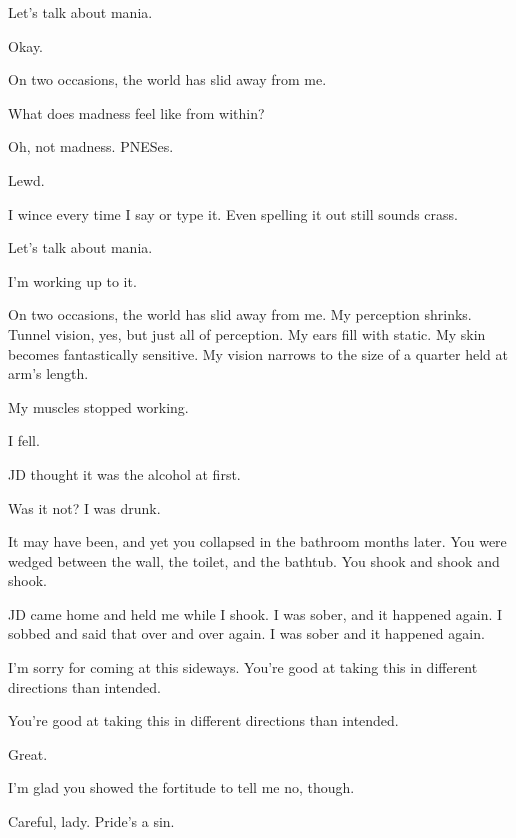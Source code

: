 \begin{ally}
Let's talk about mania.
\end{ally}
Okay.

\newpage


On two occasions, the world has slid away from me.

\begin{ally}
What does madness feel like from within?
\end{ally}
Oh, not madness. PNESes.

\begin{ally}
Lewd.
\end{ally}
I wince every time I say or type it. Even spelling it out still sounds crass.

\begin{ally}
Let's talk about mania.
\end{ally}
I'm working up to it.

On two occasions, the world has slid away from me. My perception shrinks. Tunnel vision, yes, but just all of perception. My ears fill with static. My skin becomes fantastically sensitive. My vision narrows to the size of a quarter held at arm's length.

My muscles stopped working.

I fell.

\begin{ally}
JD thought it was the alcohol at first.
\end{ally}
Was it not? I was drunk.

\begin{ally}
It may have been, and yet you collapsed in the bathroom months later. You were wedged between the wall, the toilet, and the bathtub. You shook and shook and shook.
\end{ally}
JD came home and held me while I shook. I was sober, and it happened again. I sobbed and said that over and over again. I was sober and it happened again.

I'm sorry for coming at this sideways. You're good at taking this in different directions than intended.

\begin{ally}
You're good at taking this in different directions than intended.
\end{ally}
Great.

\begin{ally}
I'm glad you showed the fortitude to tell me no, though.
\end{ally}
Careful, lady. Pride's a sin.

